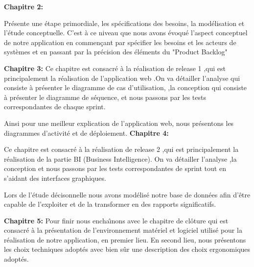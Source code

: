 \bigskip
\textbf{Chapitre 2:}

Pr\'{e}sente une \'{e}tape primordiale, les sp\'{e}cifications des besoins, la mod\'{e}lisation
et l'\'{e}tude conceptuelle. C'est \`{a} ce niveau que nous avons \'{e}voqu\'{e} l'aspect
conceptuel de notre application en commen\c{c}ant par sp\'{e}cifier les besoins et les
acteurs de syst\`{e}mes et en passant par la pr\'{e}cision des \'{e}l\'{e}ments du "Product Backlog"

\bigskip

\textbf{Chapitre 3:}
Ce chapitre est consacr\'{e} à la r\'{e}alisation de release 1 ,qui est principalement la r\'{e}alisation de l'application
web .On va d\'{e}tailler l'analyse qui consiste à pr\'{e}senter le
diagramme de cas d'utilisation, ,la conception
qui consiste à pr\'{e}senter le diagramme de s\'{e}quence,
et nous passons par les tests correspondantes de chaque sprint.

Ainsi pour une meilleur explication de l'application web, nous pr\'{e}sentons les diagrammes
d'activit\'{e} et de d\'{e}ploiement.
\newline
\bigskip
\textbf{Chapitre 4:}

Ce chapitre est consacr\'{e} à la r\'{e}alisation de release 2 ,qui est principalement la r\'{e}alisation de la partie BI (Business Intelligence).
On va d\'{e}tailler l'analyse ,la conception et nous passons  par les tests correspondantes de sprint tout en s'aidant des
interfaces graphiques.

Lors de l'\'{e}tude décisonnelle nous avons mod\'{e}lis\'{e} notre base de donn\'{e}es afin d'\^{e}tre capable de
l'exploiter et de la transformer en des rapports significatifs.


\textbf{Chapitre 5:}
Pour finir nous encha\^{\i}nons avec le chapitre de cl\^{o}ture qui est consacr\'{e} \`{a} la
pr\'{e}sentation de l'environnement mat\'{e}riel et logiciel utilis\'{e} pour la r\'{e}alisation
de notre application, en premier lieu. En second lieu, nous  pr\'{e}sentons les
choix techniques adopt\'{e}s  avec bien s\^{u}r une
description des choix ergonomiques adopt\'{e}s.






